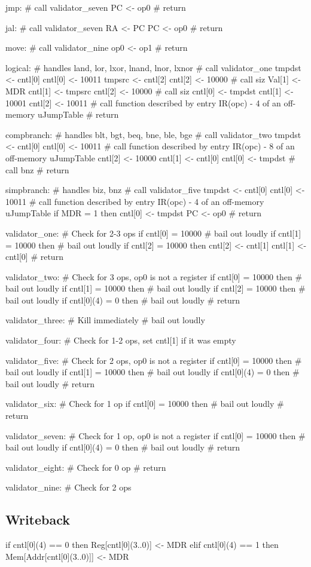 \documentclass[12pt]{article}
\begin{document}
\begin{verbatimtab}
jmp:
    # call validator_seven
    PC <- op0
    # return

jal:
    # call validator_seven
    RA <- PC    
    PC <- op0
    # return

move:
    # call validator_nine
    op0 <- op1
    # return

logical: # handles land, lor, lxor, lnand, lnor, lxnor
	# call validator_one
	tmpdst <- cntl[0]
	cntl[0] <- 10011
	tmpsrc <- cntl[2]
	cntl[2] <- 10000
	# call siz
	Val[1] <- MDR
	cntl[1] <- tmpsrc
	cntl[2] <- 10000
	# call siz
	cntl[0] <- tmpdst
	cntl[1] <- 10001
	cntl[2] <- 10011
	# call function described by entry IR(opc) - 4 of an off-memory uJumpTable
	# return

compbranch: # handles blt, bgt, beq, bne, ble, bge
	# call validator_two
	tmpdst <- cntl[0]
	cntl[0] <- 10011
	# call function described by entry IR(opc) - 8 of an off-memory uJumpTable
	cntl[2] <- 10000
	cntl[1] <- cntl[0]
	cntl[0] <- tmpdst
	# call bnz
	# return

simpbranch: # handles biz, bnz
	# call validator_five
	tmpdst <- cntl[0]
	cntl[0] <- 10011
	# call function described by entry IR(opc) - 4 of an off-memory uJumpTable
	if MDR = 1 then
		cntl[0] <- tmpdst
		PC <- op0
	# return

validator_one:
	# Check for 2-3 ops
	if cntl[0] = 10000
		# bail out loudly
	if cntl[1] = 10000 then
		# bail out loudly
	if cntl[2] = 10000 then
		cntl[2] <- cntl[1]
		cntl[1] <- cntl[0]
	# return

validator_two:
	# Check for 3 ops, op0 is not a register
	if cntl[0] = 10000 then
		# bail out loudly
	if cntl[1] = 10000 then
		# bail out loudly
	if cntl[2] = 10000 then
		# bail out loudly
	if cntl[0](4) = 0 then
		# bail out loudly
	# return

validator_three:
	# Kill immediately
	# bail out loudly

validator_four:
	# Check for 1-2 ops, set cntl[1] if it was empty

validator_five:
	# Check for 2 ops, op0 is not a register
	if cntl[0] = 10000 then
		# bail out loudly
	if cntl[1] = 10000 then
		# bail out loudly
	if cntl[0](4) = 0 then
		# bail out loudly
	# return

validator_six:
	# Check for 1 op
	if cntl[0] = 10000 then
		# bail out loudly
	# return

validator_seven:
	# Check for 1 op, op0 is not a register
	if cntl[0] = 10000 then
		# bail out loudly
	if cntl[0](4) = 0 then
		# bail out loudly
	# return

validator_eight:
	# Check for 0 op
	# return

validator_nine:
	# Check for 2 ops
\end{verbatimtab}

\subsection{Writeback}
\begin{verbatimtab}
if cntl[0](4) == 0 then
   Reg[cntl[0](3..0)] <- MDR
elif cntl[0](4) == 1 then
   Mem[Addr[cntl[0](3..0)]] <- MDR
\end{verbatimtab}
\end{document}
